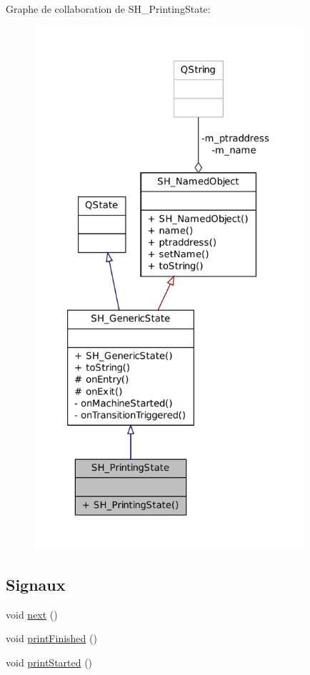 Graphe de collaboration de S\-H\-\_\-\-Printing\-State\-:
\nopagebreak
\begin{figure}[H]
\begin{center}
\leavevmode
\includegraphics[height=550pt]{classSH__PrintingState__coll__graph}
\end{center}
\end{figure}
\subsection*{Signaux}
\begin{DoxyCompactItemize}
\item 
void \hyperlink{classSH__GenericState_a030e67a872956135c52e6876d960a7b5}{next} ()
\item 
void \hyperlink{classSH__PrintingState_a3a12f5717071986937cb793e55139a39}{print\-Finished} ()
\item 
void \hyperlink{classSH__PrintingState_a51bd1a03f394b69c753b5e435a525ff2}{print\-Started} ()
\end{DoxyCompactItemize}

